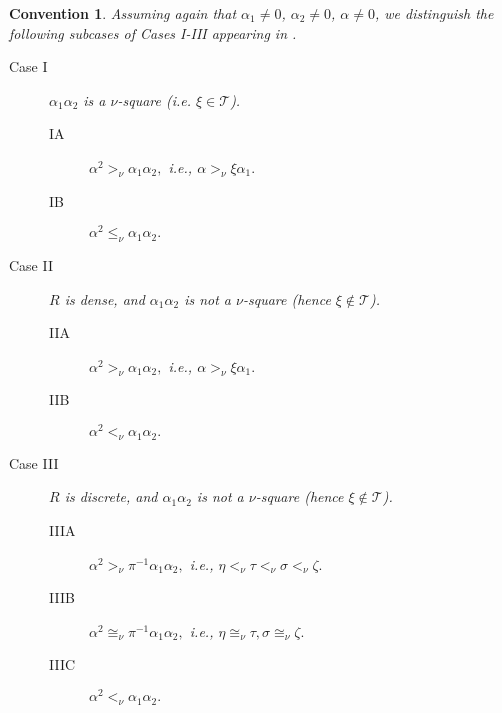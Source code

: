 \documentclass [12pt,a4paper,reqno]{amsart}
\newtheorem{convention}[thm]{Convention}
\begin{document}
\begin{convention}\label{conv:II.7.3} Assuming again that   ${\alpha}_1 \neq 0$, ${\alpha}_2 \neq 0$, ${\alpha} \neq 0$, we distinguish the following subcases of Cases I-III appearing in  \cite[Convention 7.10]{QF1}.
\begin{description}
  \item[Case I] ${\alpha}_1 {\alpha}_2$ is a $\nu$-square (i.e. ${\xi} \in {\mathcal T}$).
  \begin{description}
  \item[{{{I}}{{A}}}] ${\alpha}^2 {>_\nu} {\alpha}_1 {\alpha}_2,$ i.e., ${\alpha} {>_\nu} {\xi} {\alpha}_1.$
  \item[{{{I}}{{B}}}] ${\alpha}^2 {\leq_\nu} {\alpha}_1 {\alpha}_2.$
\end{description} {\vskip 1.5mm \noindent}

  \item[Case II] $R$ is dense, and ${\alpha}_1 {\alpha}_2$ is not a $\nu$-square (hence ${\xi} \notin {\mathcal T}$).
  \begin{description}
  \item[{{{II}}{{A}}}] ${\alpha}^2 {>_\nu} {\alpha}_1 {\alpha}_2,$ i.e., ${\alpha} {>_\nu} {\xi} {\alpha}_1.$
  \item[{{{II}}{{B}}}] ${\alpha}^2 {<_\nu} {\alpha}_1 {\alpha}_2.$
\end{description} {\vskip 1.5mm \noindent}

 \item[Case III] $R$ is discrete, and ${\alpha}_1 {\alpha}_2$ is not a $\nu$-square (hence ${\xi} \notin {\mathcal T}$).
    \begin{description}
  \item[{{{III}}{{A}}}] ${\alpha}^2 {>_\nu} \pi^{-1}{\alpha}_1 {\alpha}_2,$ i.e., $\eta {<_\nu} \tau {<_\nu} {\sigma} {<_\nu} {\zeta}.$
  \item[{{{III}}{{B}}}]  ${\alpha}^2 {\cong_\nu}  \pi^{-1}{\alpha}_1 {\alpha}_2,$ i.e., $\eta {\cong_\nu} \tau,  {\sigma} {\cong_\nu} {\zeta}.$
  \item[{{{III}}{{C}}}] ${\alpha}^2 {<_\nu} {\alpha}_1 {\alpha}_2.$
\end{description}

\end{description}

\end{convention}
\end{document}
